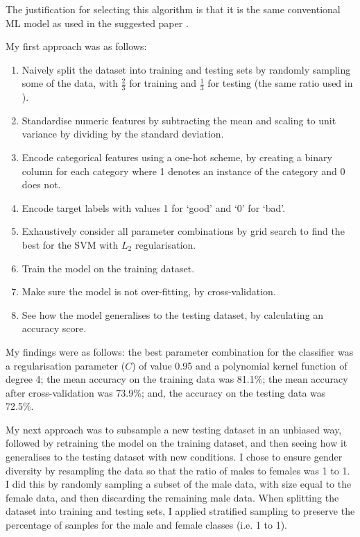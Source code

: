 \documentclass[conference]{IEEEtran}
\begin{document}
The justification for selecting this algorithm is that it is the same conventional ML model as used in the suggested paper \cite{Feldman2015ComputationalFP}.

My first approach was as follows:
\begin{enumerate}
    \item Naively split the dataset into training and testing sets by randomly sampling some of the data, with $\frac{2}{3}$ for training and $\frac{1}{3}$ for testing (the same ratio used in \cite{Feldman2015ComputationalFP}).
    \item Standardise numeric features by subtracting the mean and scaling to unit variance by dividing by the standard deviation.
    \item Encode categorical features using a one-hot scheme, by creating a binary column for each category where 1 denotes an instance of the category and 0 does not. 
    \item Encode target labels with values 1 for `good' and `0' for `bad'. 
    \item Exhaustively consider all parameter combinations by grid search to find the best for the SVM with $L_2$ regularisation. 
    \item Train the model on the training dataset.
    \item Make sure the model is not over-fitting, by cross-validation.
    \item See how the model generalises to the testing dataset, by calculating an accuracy score. 
\end{enumerate}

My findings were as follows: the best parameter combination for the classifier was a regularisation parameter ($C$) of value 0.95 and a polynomial kernel function of degree 4; the mean accuracy on the training data was 81.1\%; the mean accuracy after cross-validation was 73.9\%; and, the accuracy on the testing data was 72.5\%.   

My next approach was to subsample a new testing dataset in an unbiased way, followed by retraining the model on the training dataset, and then seeing how it generalises to the testing dataset with new conditions. I chose to ensure gender diversity by resampling the data so that the ratio of males to females was 1 to 1. I did this by randomly sampling a subset of the male data, with size equal to the female data, and then discarding the remaining male data. When splitting the dataset into training and testing sets, I applied stratified sampling to preserve the percentage of samples for the male and female classes (i.e. 1 to 1).
\end{document}
